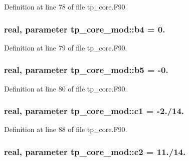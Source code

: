 Definition at line 78 of file tp\-\_\-core.\-F90.

\subsubsection[{b4}]{\setlength{\rightskip}{0pt plus 5cm}real, parameter tp\-\_\-core\-\_\-mod\-::b4 = 0.\hspace{0.3cm}{\ttfamily [private]}}\label{classtp__core__mod_ad99c7da817a0f40d730b20e3db7cc3af}


Definition at line 79 of file tp\-\_\-core.\-F90.

\subsubsection[{b5}]{\setlength{\rightskip}{0pt plus 5cm}real, parameter tp\-\_\-core\-\_\-mod\-::b5 = -\/0.\hspace{0.3cm}{\ttfamily [private]}}\label{classtp__core__mod_a22ee5d4e802fbdee793cd3cf2d976281}


Definition at line 80 of file tp\-\_\-core.\-F90.

\subsubsection[{c1}]{\setlength{\rightskip}{0pt plus 5cm}real, parameter tp\-\_\-core\-\_\-mod\-::c1 = -\/2./14.\hspace{0.3cm}{\ttfamily [private]}}\label{classtp__core__mod_accd5faf945b761ae9fc99e13da661ad1}


Definition at line 88 of file tp\-\_\-core.\-F90.

\subsubsection[{c2}]{\setlength{\rightskip}{0pt plus 5cm}real, parameter tp\-\_\-core\-\_\-mod\-::c2 = 11./14.\hspace{0.3cm}{\ttfamily [private]}}\label{classtp__core__mod_adddfe0165d9a77d9906f1427c27269a9}



